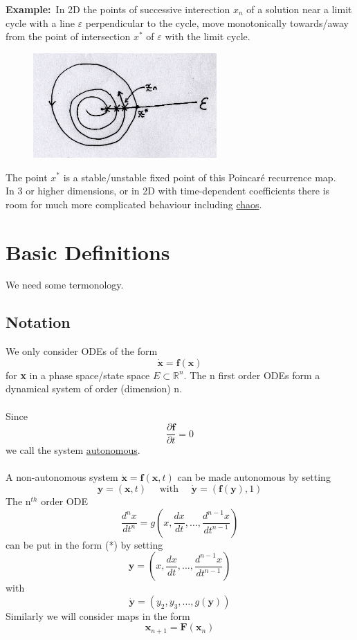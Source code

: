\documentclass{article}
\newcommand{\example}{\textbf{Example:}}                    %
\newcommand{\xeq}[1] { \dot{\bm{ #1 }} = \bm{f}(\bm{ #1}) } %
\begin{document}
\example\ In 2D the points of successive interection $x_n$ of a 
solution near a limit cycle with a line $\varepsilon$ perpendicular to the cycle,
move monotonically towards/away from the point of intersection $x^{*}$ of 
$\varepsilon$ with the limit cycle.
\begin{figure}[H]
\centering
\includegraphics[width=7cm, height=4cm]{fig2.png}
\end{figure}
\noindent
The point $x^{*}$ is a stable/unstable fixed point of this Poincar\'e recurrence
map.
\\
In 3 or higher dimensions, or in 2D with time-dependent coefficients there is 
room for much more complicated behaviour including \underline{chaos}.
\section{Basic Definitions}
We need some termonology.
\subsection{Notation}
We only consider ODEs of the form 
\begin{equation}\tag{*}
\xeq{x}
\end{equation}
for \textbf{x} in a phase space/state space $E \subset \mathbb{R}^{n}$.
The n first order ODEs form a dynamical system of order (dimension) n.
\\
\\
Since
\[ \frac{\partial \textbf{f} } { \partial t} = 0 \]
 we call the system \underline{autonomous}.
\\
\\
A non-autonomous system $\dot{\textbf{x}} = \textbf{f}(\textbf{x} ,t) $ can be
made autonomous by setting
\[ \textbf{y} = ( \textbf{x},t) \quad \mbox{ with } \quad \dot{\textbf{y}} = ( \textbf{f}(\textbf{y}),1) \]
The n$^{th}$ order ODE
\[ \frac{d ^n x}{d t^n} = g \left( x , \frac{d x}{d t} , \dots , \frac{d^{n-1} x}{d t^{n-1}} \right) \]
can be put in the form (*) by setting
\[ \textbf{y} =  \left( x , \frac{d x}{d t} , \dots , \frac{d^{n-1} x}{d t^{n-1}} \right) \]
with 
\[ \dot{\textbf{y}} =  \left( y_2 , y_3 , \dots , g( \textbf{y}) \right) \]
Similarly we will consider maps in the form
\[ \textbf{x}_{n+1} = \textbf{F}(\textbf{x}_n) \]
\end{document}
